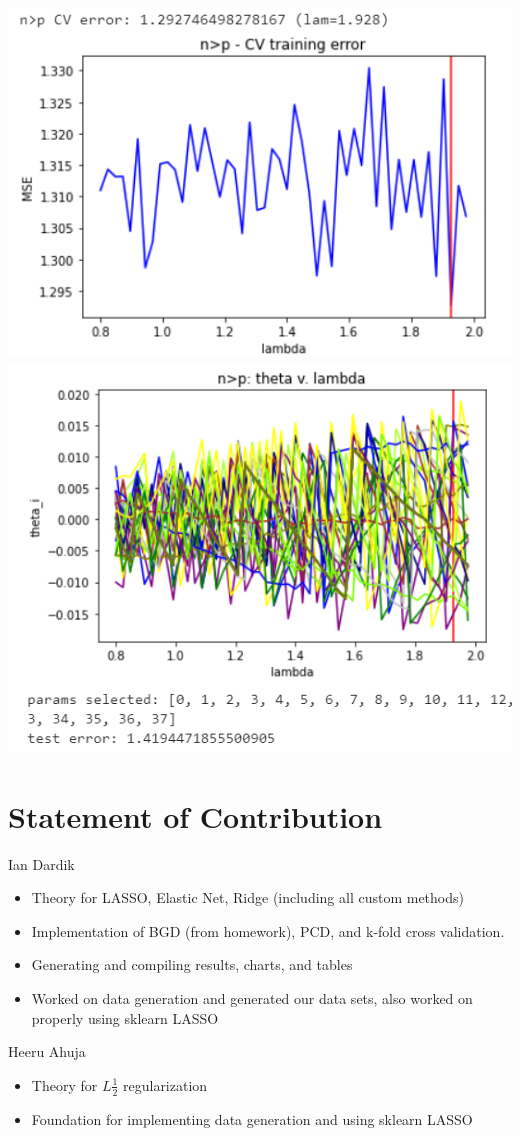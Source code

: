 \documentclass[11pt]{article}
\begin{document}
\begin{center}
\includegraphics[scale=0.7]{charts/bgd_corr_n_gt_p_err.PNG}
\includegraphics[scale=0.7]{charts/bgd_corr_n_gt_p_thetas.PNG}
\end{center}

\section{Statement of Contribution}
Ian Dardik
\begin{itemize}
	\item Theory for LASSO, Elastic Net, Ridge (including all custom methods)
	\item Implementation of BGD (from homework), PCD, and k-fold cross validation.  
	\item Generating and compiling results, charts, and tables
	\item Worked on data generation and generated our data sets, also worked on properly using sklearn LASSO
\end{itemize}

Heeru Ahuja
\begin{itemize}
	\item Theory for $L\frac{1}{2}$ regularization
	\item Foundation for implementing data generation and using sklearn LASSO
\end{itemize}
\end{document}
